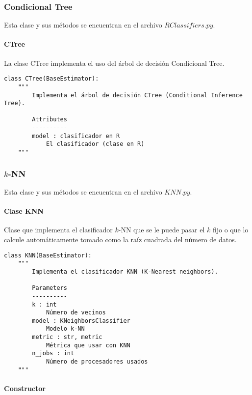 \subsubsection{Condicional Tree}

Esta clase y sus métodos se encuentran en el archivo $RClassifiers.py$.

\paragraph{CTree}

La clase CTree implementa el uso del árbol de decisión Condicional Tree.

\begin{lstlisting}
class CTree(BaseEstimator):
    """
        Implementa el árbol de decisión CTree (Conditional Inference Tree).

        Attributes
        ----------
        model : clasificador en R
            El clasificador (clase en R)
    """
\end{lstlisting}


\subsubsection{$k$-NN}

Esta clase y sus métodos se encuentran en el archivo $KNN.py$.


\paragraph{Clase KNN}

Clase que implementa el clasificador $k$-NN que se le puede pasar el $k$ fijo o que lo calcule automáticamente tomado como la raíz cuadrada del número de datos.

\begin{lstlisting}
class KNN(BaseEstimator):
    """
        Implementa el clasificador KNN (K-Nearest neighbors).

        Parameters
        ----------
        k : int
            Número de vecinos
        model : KNeighborsClassifier
            Modelo k-NN
        metric : str, metric
            Métrica que usar con KNN
        n_jobs : int
            Número de procesadores usados
    """
\end{lstlisting}

\paragraph{Constructor}

